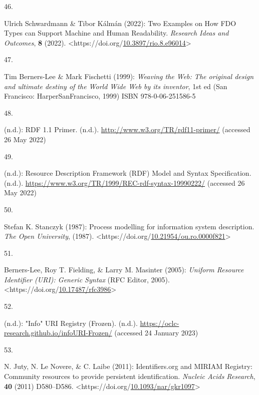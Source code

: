 \begin{thebibliography}{9}
\hypertarget{ref-schwardmannTwoExamplesHow2022}{}
46.

Ulrich Schwardmann \& Tibor Kálmán (2022): Two {Examples} on {How FDO
Types} can {Support Machine} and {Human Readability}. \emph{Research
Ideas and Outcomes}, \textbf{8} (2022).
\textless https://doi.org/\href{https://doi.org/10.3897/rio.8.e96014}{10.3897/rio.8.e96014}\textgreater{}

\hypertarget{ref-berners-leeWeavingWebOriginal1999}{}
47.

Tim Berners-Lee \& Mark Fischetti (1999): \emph{Weaving the {Web}: The
original design and ultimate destiny of the {World Wide Web} by its
inventor}, 1st ed ({San Francisco}: {HarperSanFrancisco}, 1999) ISBN
978-0-06-251586-5

\hypertarget{ref-w3-rdf11-primer}{}
48.

(n.d.): {RDF} 1.1 {Primer}. (n.d.).
\url{http://www.w3.org/TR/rdf11-primer/} (accessed 26 May 2022)

\hypertarget{ref-w3-rdf-syntax}{}
49.

(n.d.): Resource {Description Framework} ({RDF}) {Model} and {Syntax
Specification}. (n.d.).
\url{https://www.w3.org/TR/1999/REC-rdf-syntax-19990222/} (accessed 26
May 2022)

\hypertarget{ref-stanczykProcessModellingInformation1987}{}
50.

Stefan K. Stanczyk (1987): Process modelling for information system
description. \emph{The Open University}, (1987).
\textless https://doi.org/\href{https://doi.org/10.21954/ou.ro.0000f821}{10.21954/ou.ro.0000f821}\textgreater{}

\hypertarget{ref-rfc3986}{}
51.

Berners-Lee, Roy T. Fielding, \& Larry M. Masinter (2005): \emph{Uniform
{Resource Identifier} ({URI}): {Generic Syntax}} ({RFC Editor}, 2005).
\textless https://doi.org/\href{https://doi.org/10.17487/rfc3986}{10.17487/rfc3986}\textgreater{}

\hypertarget{ref-InfoURIRegistry}{}
52.

(n.d.): "Info" {URI Registry} ({Frozen}). (n.d.).
\url{https://oclc-research.github.io/infoURI-Frozen/} (accessed 24
January 2023)

\hypertarget{ref-jutyIdentifiersOrgMIRIAM2011}{}
53.

N. Juty, N. Le Novere, \& C. Laibe (2011): Identifiers.org and {MIRIAM
Registry}: Community resources to provide persistent identification.
\emph{Nucleic Acids Research}, \textbf{40} (2011) D580--D586.
\textless https://doi.org/\href{https://doi.org/10.1093/nar/gkr1097}{10.1093/nar/gkr1097}\textgreater{}


\end{thebibliography}
